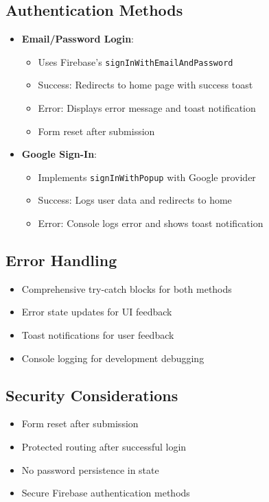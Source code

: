\subsection{Authentication Methods}
\begin{itemize}
    \item \textbf{Email/Password Login}:
    \begin{itemize}
        \item Uses Firebase's \texttt{signInWithEmailAndPassword}
        \item Success: Redirects to home page with success toast
        \item Error: Displays error message and toast notification
        \item Form reset after submission
    \end{itemize}
    
    \item \textbf{Google Sign-In}:
    \begin{itemize}
        \item Implements \texttt{signInWithPopup} with Google provider
        \item Success: Logs user data and redirects to home
        \item Error: Console logs error and shows toast notification
    \end{itemize}
\end{itemize}

\subsection{Error Handling}
\begin{itemize}
    \item Comprehensive try-catch blocks for both methods
    \item Error state updates for UI feedback
    \item Toast notifications for user feedback
    \item Console logging for development debugging
\end{itemize}

\subsection{Security Considerations}
\begin{itemize}
    \item Form reset after submission
    \item Protected routing after successful login
    \item No password persistence in state
    \item Secure Firebase authentication methods
\end{itemize}

